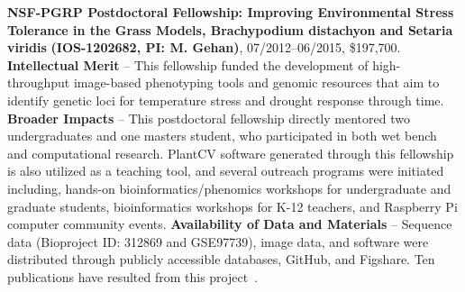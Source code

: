 {\bf NSF-PGRP Postdoctoral Fellowship: Improving Environmental Stress Tolerance in the Grass Models, Brachypodium distachyon and Setaria viridis}
{\bf (IOS-1202682, PI: M. Gehan)},
07/2012--06/2015, \$197,700.
%
\textbf{Intellectual Merit} -- This fellowship funded the
development of high-throughput image-based phenotyping tools and genomic
resources that aim to identify genetic loci for temperature stress and drought
response through time.
%
%
\textbf{Broader Impacts} -- This postdoctoral
fellowship directly mentored two undergraduates and one masters student, who
participated in both wet bench and computational research. PlantCV software
generated through this fellowship is also utilized as a teaching tool, and
several outreach programs were initiated including, hands-on
bioinformatics/phenomics workshops for undergraduate and graduate students,
bioinformatics workshops for K-12 teachers, and Raspberry Pi computer community
events.
%
\textbf{Availability of Data and Materials} -- Sequence data (Bioproject
ID: 312869 and GSE97739), image data, and software were distributed through
publicly accessible databases, GitHub, and Figshare. Ten publications have
resulted from this project~\cite{Bucksch17,Fahlgren+15,fgb15,Feldman18,gfa+17,ggm+15,gk17,ggg+17,hgh+17,Tovar18}.
